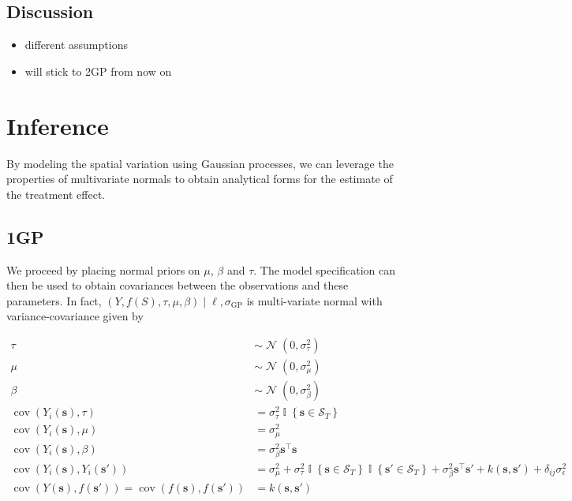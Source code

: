 \documentclass[letter]{article}
\providecommand{\tightlist}{%
      \setlength{\itemsep}{0pt}\setlength{\parskip}{0pt}}
\newcommand{\genericdel}[3]{%
      \left#1#3\right#2
    }
\newcommand{\del}[1]{\genericdel(){#1}}
\newcommand{\cbr}[1]{\genericdel\{\}{#1}}
\DeclareMathOperator{\cov}{{cov}}
\DeclareMathOperator{\Ind}{\mathbb{I}}
\DeclareMathOperator{\normal}{\mathcal{N}}
\newcommand{\trans}{^{\intercal}}
\newcommand{\scrS}{\mathscr{S}}
\newcommand{\sigmaf}{\sigma_{\mathrm{GP}}}
\newcommand{\sigman}{\sigma_{\epsilon}}
\newcommand{\sigmatau}{\sigma_{\tau}}
\newcommand{\sigmabeta}{\sigma_{\beta}}
\newcommand{\sigmamu}{\sigma_{\mu}}
\newcommand{\svec}{\mathbold{s}}
\providecommand{\tightlist}{%
  	  \setlength{\itemsep}{0pt}\setlength{\parskip}{0pt}}
\begin{document}
    	\subsection{Discussion}\label{discussion}

\begin{itemize}
\tightlist
\item
  different assumptions
\item
  will stick to 2GP from now on
\end{itemize}
    


    	\section{Inference}\label{inference}

By modeling the spatial variation using Gaussian processes, we can
leverage the properties of multivariate normals to obtain analytical
forms for the estimate of the treatment effect.
    


    	\subsection{1GP}\label{gp}

We proceed by placing normal priors on \(\mu\), \(\beta\) and \(\tau\).
The model specification can then be used to obtain covariances between
the observations and these parameters. In fact,
\(\del{Y,f(S),\tau,\mu,\beta} \mid \ell,\sigmaf\) is multi-variate
normal with variance-covariance given by

\begin{equation}
\begin{split}
    \tau  &\sim \normal\del{0,\sigmatau^2} \\
    \mu   &\sim \normal\del{0,\sigmamu^2} \\
    \beta &\sim \normal\del{0,\sigmabeta^2} \\
    \cov(Y_i(\svec),\tau) &= \sigmatau^2 \Ind\cbr{\svec \in \scrS_T} \\
    \cov(Y_i(\svec),\mu)  &= \sigmamu^2 \\
    \cov(Y_i(\svec),\beta)&= \sigmabeta^2 \svec\trans \svec \\
    \cov(Y_i(\svec),Y_i(\svec'))&= \sigmamu^2 + \sigmatau^2 \Ind\cbr{\svec \in \scrS_T}\Ind\cbr{\svec' \in \scrS_T} + \sigmabeta^2 \svec\trans \svec' + k(\svec,\svec') + \delta_{ij}\sigman^2\\
    \cov(Y(\svec),f(\svec')) = \cov(f(\svec),f(\svec')) &= k(\svec,\svec')
\end{split}
\end{equation}
\end{document}
